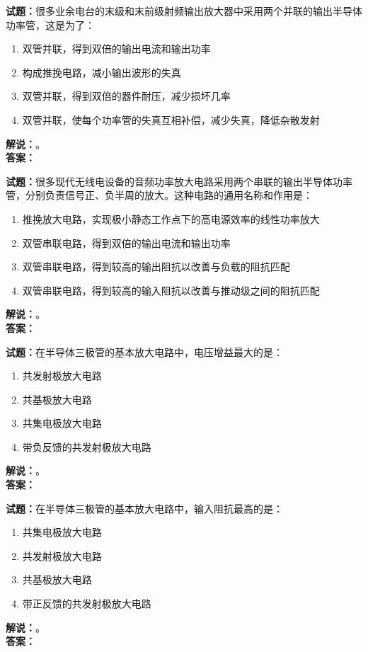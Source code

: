 \documentclass{ctexbook}
\begin{document}
\bigskip




\noindent\textbf{试题：}很多业余电台的末级和末前级射频输出放大器中采用两个并联的输出半导体功率管，这是为了：
\begin{enumerate}[leftmargin=3em]
\item 双管并联，得到双倍的输出电流和输出功率
\item 构成推挽电路，减小输出波形的失真
\item 双管并联，得到双倍的器件耐压，减少损坏几率
\item 双管并联，使每个功率管的失真互相补偿，减少失真，降低杂散发射
\end{enumerate}
\noindent\textbf{解说：}\textbf{}。\\\noindent\textbf{答案：}

\bigskip




\noindent\textbf{试题：}很多现代无线电设备的音频功率放大电路采用两个串联的输出半导体功率管，分别负责信号正、负半周的放大。这种电路的通用名称和作用是：
\begin{enumerate}[leftmargin=3em]
\item 推挽放大电路，实现极小静态工作点下的高电源效率的线性功率放大
\item 双管串联电路，得到双倍的输出电流和输出功率
\item 双管串联电路，得到较高的输出阻抗以改善与负载的阻抗匹配
\item 双管串联电路，得到较高的输入阻抗以改善与推动级之间的阻抗匹配
\end{enumerate}
\noindent\textbf{解说：}\textbf{}。\\\noindent\textbf{答案：}

\bigskip




\noindent\textbf{试题：}在半导体三极管的基本放大电路中，电压增益最大的是：
\begin{enumerate}[leftmargin=3em]
\item 共发射极放大电路
\item 共基极放大电路
\item 共集电极放大电路
\item 带负反馈的共发射极放大电路
\end{enumerate}
\noindent\textbf{解说：}\textbf{}。\\\noindent\textbf{答案：}

\bigskip




\noindent\textbf{试题：}在半导体三极管的基本放大电路中，输入阻抗最高的是：
\begin{enumerate}[leftmargin=3em]
\item 共集电极放大电路
\item 共发射极放大电路
\item 共基极放大电路
\item 带正反馈的共发射极放大电路
\end{enumerate}
\noindent\textbf{解说：}\textbf{}。\\\noindent\textbf{答案：}
\end{document}
